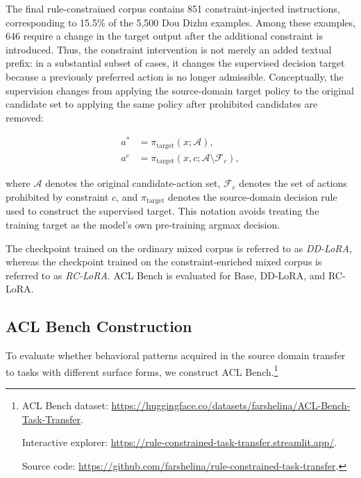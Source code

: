 The final rule-constrained corpus contains 851 constraint-injected instructions, corresponding to 15.5\% of the 5,500 Dou Dizhu examples. Among these examples, 646 require a change in the target output after the additional constraint is introduced. Thus, the constraint intervention is not merely an added textual prefix: in a substantial subset of cases, it changes the supervised decision target because a previously preferred action is no longer admissible. Conceptually, the supervision changes from applying the source-domain target policy to the original candidate set to applying the same policy after prohibited candidates are removed:

\begin{equation}
\begin{aligned}
a^{*}
&=
\pi_{\mathrm{target}}(x;\mathcal{A}), \\
a^{c}
&=
\pi_{\mathrm{target}}(x,c;\mathcal{A}\setminus\mathcal{F}_{c}),
\end{aligned}
\label{eq:rule_constrained_policy}
\end{equation}

where $\mathcal{A}$ denotes the original candidate-action set, $\mathcal{F}_{c}$ denotes the set of actions prohibited by constraint $c$, and $\pi_{\mathrm{target}}$ denotes the source-domain decision rule used to construct the supervised target. This notation avoids treating the training target as the model's own pre-training argmax decision.

The checkpoint trained on the ordinary mixed corpus is referred to as \emph{DD-LoRA}, whereas the checkpoint trained on the constraint-enriched mixed corpus is referred to as \emph{RC-LoRA}. ACL Bench is evaluated for Base, DD-LoRA, and RC-LoRA.

\subsection{ACL Bench Construction}
\label{sec:acl_bench}

To evaluate whether behavioral patterns acquired in the source domain transfer to tasks with different surface forms, we construct ACL Bench.\footnote{\raggedright ACL Bench dataset: \url{https://huggingface.co/datasets/farshelina/ACL-Bench-Task-Transfer}.\par Interactive explorer: \url{https://rule-constrained-task-transfer.streamlit.app/}.\par Source code: \url{https://github.com/farshelina/rule-constrained-task-transfer}.}

